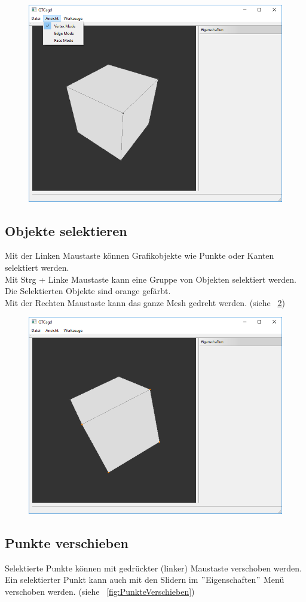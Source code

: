 \begin{figure}[ht!]
	\centering
	\includegraphics[width=0.6\linewidth]{content/pictures/2-Ansichtsmodi}
	\label{fig:Ansichtsmodi}
	\caption{}
\end{figure}

\subsection{Objekte selektieren}
Mit der Linken Maustaste können Grafikobjekte wie Punkte oder Kanten selektiert werden.\\
Mit Strg + Linke Maustaste kann eine Gruppe von Objekten selektiert werden.\\
Die Selektierten Objekte sind orange gefärbt.\\
Mit der Rechten Maustaste kann das ganze Mesh gedreht werden. (siehe ~\ref{fig:ObjekteSelektieren})\\

\begin{figure}[ht!]
	\centering
	\includegraphics[width=0.6\linewidth]{content/pictures/3-ObjekteSelektieren}
	\label{fig:ObjekteSelektieren}
	\caption{}
\end{figure}

\subsection{Punkte verschieben}
Selektierte Punkte können mit gedrückter (linker) Maustaste verschoben werden.\\
Ein selektierter Punkt kann auch mit den Slidern im $"$Eigenschaften$"$ Menü verschoben werden.  (siehe ~\ref{fig:PunkteVerschieben})

